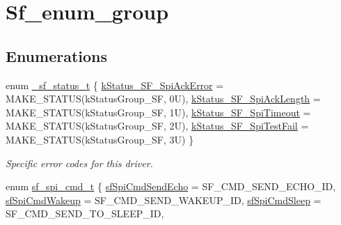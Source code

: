 \hypertarget{group__sf__enum__group}{}\section{Sf\+\_\+enum\+\_\+group}
\label{group__sf__enum__group}
\subsection*{Enumerations}
\begin{DoxyCompactItemize}
\item 
enum \mbox{\hyperlink{group__sf__enum__group_ga1b29c7c81b1098654855dd013cb61b56}{\+\_\+sf\+\_\+status\+\_\+t}} \{ \mbox{\hyperlink{group__sf__enum__group_gga1b29c7c81b1098654855dd013cb61b56a74c58258f59ceb3ec13c27709238ddf7}{k\+Status\+\_\+\+S\+F\+\_\+\+Spi\+Ack\+Error}} = M\+A\+K\+E\+\_\+\+S\+T\+A\+T\+US(k\+Status\+Group\+\_\+\+SF, 0U), 
\mbox{\hyperlink{group__sf__enum__group_gga1b29c7c81b1098654855dd013cb61b56a00e81a58055c9f563ea397797ce408f5}{k\+Status\+\_\+\+S\+F\+\_\+\+Spi\+Ack\+Length}} = M\+A\+K\+E\+\_\+\+S\+T\+A\+T\+US(k\+Status\+Group\+\_\+\+SF, 1U), 
\mbox{\hyperlink{group__sf__enum__group_gga1b29c7c81b1098654855dd013cb61b56a5ae3424a02fc31c3e6482b6245e0dda8}{k\+Status\+\_\+\+S\+F\+\_\+\+Spi\+Timeout}} = M\+A\+K\+E\+\_\+\+S\+T\+A\+T\+US(k\+Status\+Group\+\_\+\+SF, 2U), 
\mbox{\hyperlink{group__sf__enum__group_gga1b29c7c81b1098654855dd013cb61b56a82b543f202905c06ab2dca7133ec7617}{k\+Status\+\_\+\+S\+F\+\_\+\+Spi\+Test\+Fail}} = M\+A\+K\+E\+\_\+\+S\+T\+A\+T\+US(k\+Status\+Group\+\_\+\+SF, 3U)
 \}
\begin{DoxyCompactList}\small\item\em Specific error codes for this driver. \end{DoxyCompactList}\item 
enum \mbox{\hyperlink{group__sf__enum__group_ga06921e348326a2db772246fef63b2545}{sf\+\_\+spi\+\_\+cmd\+\_\+t}} \{ \newline
\mbox{\hyperlink{group__sf__enum__group_gga06921e348326a2db772246fef63b2545a323b9fcd84e1c29fb2bf3bbdc5b485cf}{sf\+Spi\+Cmd\+Send\+Echo}} = S\+F\+\_\+\+C\+M\+D\+\_\+\+S\+E\+N\+D\+\_\+\+E\+C\+H\+O\+\_\+\+ID, 
\mbox{\hyperlink{group__sf__enum__group_gga06921e348326a2db772246fef63b2545a4135c70bed7a3c56f4e645e7b2c8c709}{sf\+Spi\+Cmd\+Wakeup}} = S\+F\+\_\+\+C\+M\+D\+\_\+\+S\+E\+N\+D\+\_\+\+W\+A\+K\+E\+U\+P\+\_\+\+ID, 
\mbox{\hyperlink{group__sf__enum__group_gga06921e348326a2db772246fef63b2545aac58778261544ebfae70c74d75d0a38e}{sf\+Spi\+Cmd\+Sleep}} = S\+F\+\_\+\+C\+M\+D\+\_\+\+S\+E\+N\+D\+\_\+\+T\+O\+\_\+\+S\+L\+E\+E\+P\+\_\+\+ID, 

\end{DoxyCompactItemize}
